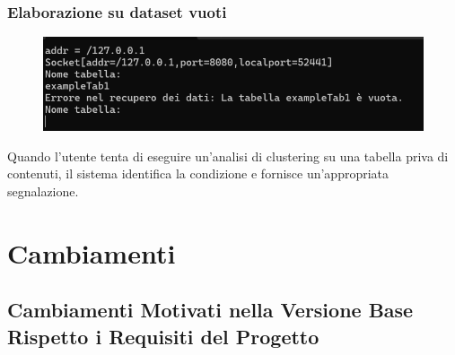 \subsubsection{Elaborazione su dataset vuoti} 
    \begin{figure}[h!]
        \centering
        \includegraphics[width=\textwidth]{images/dataset_vuoti.png}
    \end{figure}

Quando l'utente tenta di eseguire un'analisi di clustering su una tabella priva di contenuti, il sistema identifica la condizione e fornisce un'appropriata segnalazione.


\section{Cambiamenti}

\subsection{Cambiamenti Motivati nella Versione Base Rispetto i Requisiti del Progetto}

